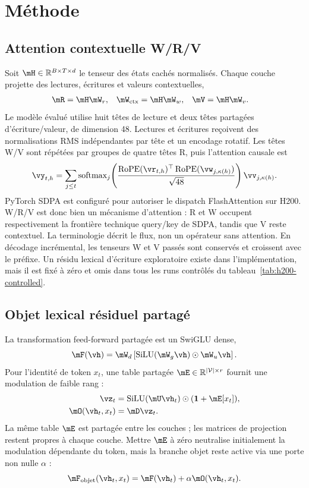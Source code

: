 \section{Méthode}
\label{sec:method}

\subsection{Attention contextuelle W/R/V}

Soit $\mH\in\mathbb{R}^{B\times T\times d}$ le tenseur des états cachés normalisés. Chaque couche projette des lectures, écritures et valeurs contextuelles,
\begin{align}
    \mR &= \mH\mW_r, &
    \mW_{\mathrm{ctx}} &= \mH\mW_w, &
    \mV &= \mH\mW_v.
\end{align}
Le modèle évalué utilise huit têtes de lecture et deux têtes partagées d'écriture/valeur, de dimension 48. Lectures et écritures reçoivent des normalisations RMS indépendantes par tête et un encodage rotatif. Les têtes W/V sont répétées par groupes de quatre têtes R, puis l'attention causale est
\begin{equation}
    \vy_{t,h}=\sum_{j\le t}
    \operatorname{softmax}_j\!\left(
      \frac{\operatorname{RoPE}(\vr_{t,h})^\top
      \operatorname{RoPE}(\vw_{j,\kappa(h)})}{\sqrt{48}}
    \right)\vv_{j,\kappa(h)}.
\end{equation}
PyTorch SDPA est configuré pour autoriser le dispatch FlashAttention sur H200. W/R/V est donc bien un mécanisme d'attention : R et W occupent respectivement la frontière technique query/key de SDPA, tandis que V reste contextuel. La terminologie décrit le flux, non un opérateur sans attention. En décodage incrémental, les tenseurs W et V passés sont conservés et croissent avec le préfixe. Un résidu lexical d'écriture exploratoire existe dans l'implémentation, mais il est fixé à zéro et omis dans tous les runs contrôlés du tableau~\ref{tab:h200-controlled}.

\subsection{Objet lexical résiduel partagé}

La transformation feed-forward partagée est un SwiGLU dense,
\begin{equation}
    \mF(\vh)=\mW_d\left[\operatorname{SiLU}(\mW_g\vh)\odot \mW_u\vh\right].
\end{equation}
Pour l'identité de token $x_t$, une table partagée $\mE\in\mathbb{R}^{|\mathcal V|\times r}$ fournit une modulation de faible rang :
\begin{align}
    \vz_t &= \operatorname{SiLU}(\mU\vh_t)\odot(\mathbf{1}+\mE[x_t]),\\
    \mO(\vh_t,x_t) &= \mD\vz_t.
\end{align}
La même table $\mE$ est partagée entre les couches ; les matrices de projection restent propres à chaque couche. Mettre $\mE$ à zéro neutralise initialement la modulation dépendante du token, mais la branche objet reste active via une porte non nulle $\alpha$ :
\begin{equation}
    \mF_{\mathrm{objet}}(\vh_t,x_t)=\mF(\vh_t)+\alpha\mO(\vh_t,x_t).
\end{equation}

